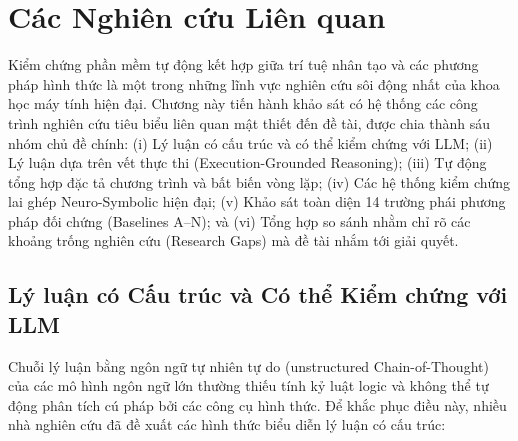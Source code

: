 \chapter{Các Nghiên cứu Liên quan}
\label{ch:related_work}

Kiểm chứng phần mềm tự động kết hợp giữa trí tuệ nhân tạo và các phương pháp hình thức là một trong những lĩnh vực nghiên cứu sôi động nhất của khoa học máy tính hiện đại. Chương này tiến hành khảo sát có hệ thống các công trình nghiên cứu tiêu biểu liên quan mật thiết đến đề tài, được chia thành sáu nhóm chủ đề chính: (i) Lý luận có cấu trúc và có thể kiểm chứng với LLM; (ii) Lý luận dựa trên vết thực thi (Execution-Grounded Reasoning); (iii) Tự động tổng hợp đặc tả chương trình và bất biến vòng lặp; (iv) Các hệ thống kiểm chứng lai ghép Neuro-Symbolic hiện đại; (v) Khảo sát toàn diện 14 trường phái phương pháp đối chứng (Baselines A--N); và (vi) Tổng hợp so sánh nhằm chỉ rõ các khoảng trống nghiên cứu (Research Gaps) mà đề tài nhắm tới giải quyết.

\section{Lý luận có Cấu trúc và Có thể Kiểm chứng với LLM}
\label{sec:structured_verifiable_reasoning}

Chuỗi lý luận bằng ngôn ngữ tự nhiên tự do (unstructured Chain-of-Thought) của các mô hình ngôn ngữ lớn thường thiếu tính kỷ luật logic và không thể tự động phân tích cú pháp bởi các công cụ hình thức. Để khắc phục điều này, nhiều nhà nghiên cứu đã đề xuất các hình thức biểu diễn lý luận có cấu trúc:

